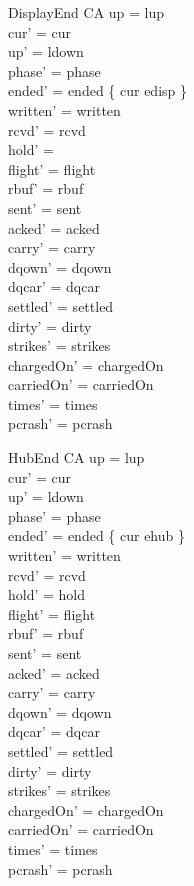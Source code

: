 \documentclass[a4paper,10pt,fleqn]{article}
\begin{document}
\begin{schema}{DisplayEnd}
  \Delta CA
\where
  up = lup \\
  cur' = cur \\
  up' = ldown \\
  phase' = phase \\
  ended' = ended \oplus \{ cur \mapsto edisp \} \\
  written' = written \\
  rcvd' = rcvd \\
  hold' = \emptyset \\
  flight' = flight \\
  rbuf' = rbuf \\
  sent' = sent \\
  acked' = acked \\
  carry' = carry \\
  dqown' = dqown \\
  dqcar' = dqcar \\
  settled' = settled \\
  dirty' = dirty \\
  strikes' = strikes \\
  chargedOn' = chargedOn \\
  carriedOn' = carriedOn \\
  times' = times \\
  pcrash' = pcrash
\end{schema}

\begin{schema}{HubEnd}
  \Delta CA
\where
  up = lup \\
  cur' = cur \\
  up' = ldown \\
  phase' = phase \\
  ended' = ended \oplus \{ cur \mapsto ehub \} \\
  written' = written \\
  rcvd' = rcvd \\
  hold' = hold \\
  flight' = flight \\
  rbuf' = rbuf \\
  sent' = sent \\
  acked' = acked \\
  carry' = carry \\
  dqown' = dqown \\
  dqcar' = dqcar \\
  settled' = settled \\
  dirty' = dirty \\
  strikes' = strikes \\
  chargedOn' = chargedOn \\
  carriedOn' = carriedOn \\
  times' = times \\
  pcrash' = pcrash
\end{schema}
\end{document}
